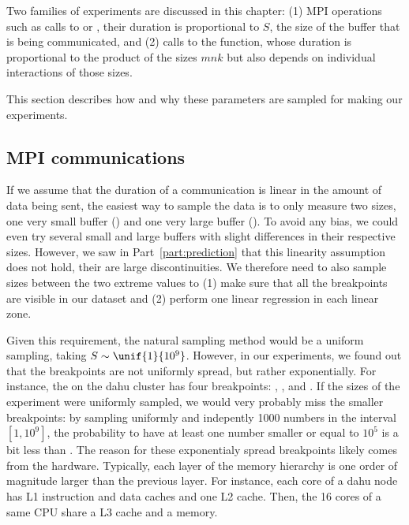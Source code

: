         Two families of experiments are discussed in this chapter: (1) MPI operations such as calls to
        \recv or \send, their duration is proportional to $S$, the size of the buffer that is
        being communicated, and (2) calls to the \dgemm function, whose duration is proportional to the product
        of the sizes $mnk$ but also depends on individual interactions of those sizes.

        This section describes how and why these parameters are sampled for making our experiments.

        \subsection{MPI communications}%

            If we assume that the duration of a communication is linear in the amount of data being sent, the easiest
            way to sample the data is to only measure two sizes, one very small buffer (\eg {}) and one very
            large buffer (\eg {}). To avoid any bias, we could even try several small and large
            buffers with slight differences in their respective sizes. However, we saw in Part~\ref{part:prediction}
            that this linearity assumption does not hold, their are large discontinuities. We therefore need to also
            sample sizes between the two extreme values to (1) make sure that all the breakpoints are visible in our
            dataset and (2) perform one linear regression in each linear zone.

            Given this requirement, the natural sampling method would be a uniform sampling, taking
            \(S\sim\unif{1}{10^9}\). However, in our experiments, we found out that the breakpoints are not uniformly
            spread, but rather exponentially. For instance, the \send on the dahu cluster has four
            breakpoints: , ,  and
            . If the sizes of the experiment were uniformly sampled, we would very probably miss
            the smaller breakpoints: by sampling uniformly and indepently 1000 numbers in the interval \([1, 10^9]\),
            the probability to have at least one number smaller or equal to \(10^5\) is a bit less than
            . The reason for these exponentialy spread breakpoints likely comes from the hardware.
            Typically, each layer of the memory hierarchy is one order of magnitude larger than the previous layer. For
            instance, each core of a dahu node has  L1 instruction and data caches and one
             L2 cache. Then, the 16 cores of a same CPU share a  L3 cache and
            a  memory.

